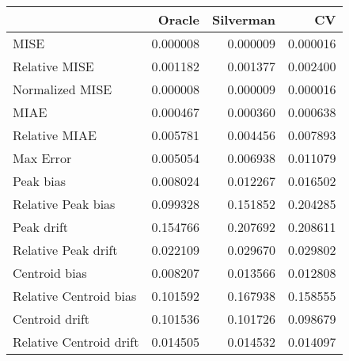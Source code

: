 \begin{tabular}{lrrr}
  \hline
 & Oracle & Silverman & CV \\ 
  \hline
MISE & 0.000008 & 0.000009 & 0.000016 \\ 
  Relative MISE & 0.001182 & 0.001377 & 0.002400 \\ 
  Normalized MISE & 0.000008 & 0.000009 & 0.000016 \\ 
  MIAE & 0.000467 & 0.000360 & 0.000638 \\ 
  Relative MIAE & 0.005781 & 0.004456 & 0.007893 \\ 
  Max Error & 0.005054 & 0.006938 & 0.011079 \\ 
  Peak bias & 0.008024 & 0.012267 & 0.016502 \\ 
  Relative Peak bias & 0.099328 & 0.151852 & 0.204285 \\ 
  Peak drift & 0.154766 & 0.207692 & 0.208611 \\ 
  Relative Peak drift & 0.022109 & 0.029670 & 0.029802 \\ 
  Centroid bias & 0.008207 & 0.013566 & 0.012808 \\ 
  Relative Centroid bias & 0.101592 & 0.167938 & 0.158555 \\ 
  Centroid drift & 0.101536 & 0.101726 & 0.098679 \\ 
  Relative Centroid drift & 0.014505 & 0.014532 & 0.014097 \\ 
   \hline
\end{tabular}
